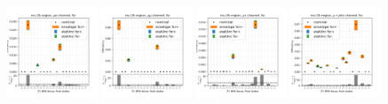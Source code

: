\begin{figure}
    \includegraphics[width=0.24\textwidth]{appendices/ttSystReweighting/figures/afterCorr/icata1_ch0_fsr.png}
    \includegraphics[width=0.24\textwidth]{appendices/ttSystReweighting/figures/afterCorr/icata1_ch1_fsr.png}
    \includegraphics[width=0.24\textwidth]{appendices/ttSystReweighting/figures/afterCorr/icata1_ch2_fsr.png}
    \includegraphics[width=0.24\textwidth]{appendices/ttSystReweighting/figures/afterCorr/icata1_ch3_fsr.png}
    

\end{figure}
